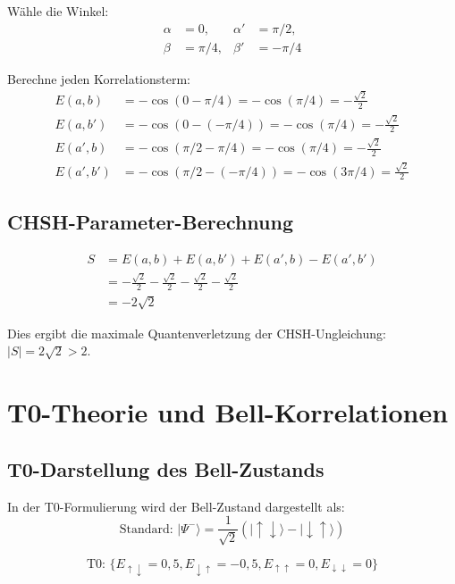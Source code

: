 \documentclass[12pt,a4paper]{article}
\begin{document}
		W\"ahle die Winkel:
		\begin{align}
			\alpha &= 0, & \alpha' &= \pi/2, \\
			\beta &= \pi/4, & \beta' &= -\pi/4
		\end{align}
		
		Berechne jeden Korrelationsterm:
		\begin{align}
			E(a,b) &= -\cos(0-\pi/4) = -\cos(\pi/4) = -\frac{\sqrt{2}}{2} \\
			E(a,b') &= -\cos(0-(-\pi/4)) = -\cos(\pi/4) = -\frac{\sqrt{2}}{2} \\
			E(a',b) &= -\cos(\pi/2-\pi/4) = -\cos(\pi/4) = -\frac{\sqrt{2}}{2} \\
			E(a',b') &= -\cos(\pi/2-(-\pi/4)) = -\cos(3\pi/4) = \frac{\sqrt{2}}{2}
		\end{align}
		
		\subsection{CHSH-Parameter-Berechnung}
		
		\begin{align}
			S &= E(a,b) + E(a,b') + E(a',b) - E(a',b') \\
			&= -\frac{\sqrt{2}}{2} - \frac{\sqrt{2}}{2} - \frac{\sqrt{2}}{2} - \frac{\sqrt{2}}{2} \\
			&= -2\sqrt{2}
		\end{align}
		
		Dies ergibt die maximale Quantenverletzung der CHSH-Ungleichung: $|S| = 2\sqrt{2} > 2$.

	
	\section{T0-Theorie und Bell-Korrelationen}
	
	
		\subsection{T0-Darstellung des Bell-Zustands}
		
		In der T0-Formulierung wird der Bell-Zustand dargestellt als:
		\begin{equation}
			\text{Standard: } |\Psi^-\rangle = \frac{1}{\sqrt{2}}(|\uparrow\downarrow\rangle - |\downarrow\uparrow\rangle)
		\end{equation}
		
		\begin{equation}
			\text{T0: } \{E_{\uparrow\downarrow} = 0{,}5, E_{\downarrow\uparrow} = -0{,}5, E_{\uparrow\uparrow} = 0, E_{\downarrow\downarrow} = 0\}
		\end{equation}
		
\end{document}
